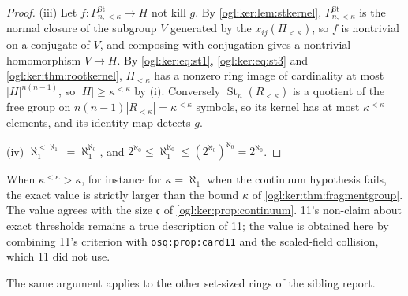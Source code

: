 \documentclass[11pt,oneside]{article}
\numberwithin{equation}{section}
\theoremstyle{definition}
\theoremstyle{remark}
\newcommand{\St}{\operatorname{St}}
\newcommand{\replabel}[1]{\nolinkurl{#1}}
\begin{document}
\begin{proof}
(iii) Let $f:P^{\St}_{n,<\kappa}\to H$ not kill $g$. By
\cref{ogl:ker:lem:stkernel}, $P^{\St}_{n,<\kappa}$ is the normal closure of the
subgroup $V$ generated by the $x_{ij}(\Pi_{<\kappa})$, so $f$ is nontrivial on a
conjugate of $V$, and composing with conjugation gives a nontrivial homomorphism
$V\to H$. By \eqref{ogl:ker:eq:st1}, \eqref{ogl:ker:eq:st3} and
\cref{ogl:ker:thm:rootkernel}, $\Pi_{<\kappa}$ has a nonzero ring image of
cardinality at most $|H|^{n(n-1)}$, so $|H|\ge\kappa^{<\kappa}$ by (i). Conversely
$\St_n(R_{<\kappa})$ is a quotient of the free group on $n(n-1)|R_{<\kappa}|=
\kappa^{<\kappa}$ symbols, so its kernel has at most $\kappa^{<\kappa}$ elements,
and its identity map detects $g$.

(iv) $\aleph_1^{<\aleph_1}=\aleph_1^{\aleph_0}$, and
$2^{\aleph_0}\le\aleph_1^{\aleph_0}\le(2^{\aleph_0})^{\aleph_0}=2^{\aleph_0}$.
\end{proof}

When $\kappa^{<\kappa}>\kappa$, for instance for $\kappa=\aleph_1$ when the
continuum hypothesis fails, the exact value is strictly larger than the bound
$\kappa$ of \cref{ogl:ker:thm:fragmentgroup}. The value agrees with the size
$\mathfrak c$ of \cref{ogl:ker:prop:continuum}. 11's non-claim about exact
thresholds remains a true description of 11; the value is obtained here by
combining 11's criterion with \replabel{osq:prop:card11} and the scaled-field
collision, which 11 did not use.

The same argument applies to the other set-sized rings of the sibling report.
\end{document}
